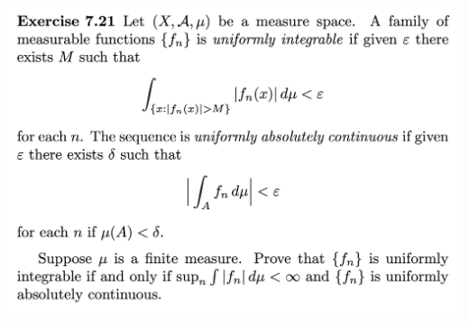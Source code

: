 \begin{mdframed}
\includegraphics[width=400pt]{img/analysis--berkeley-202a-hw08-337f.png}
\end{mdframed}